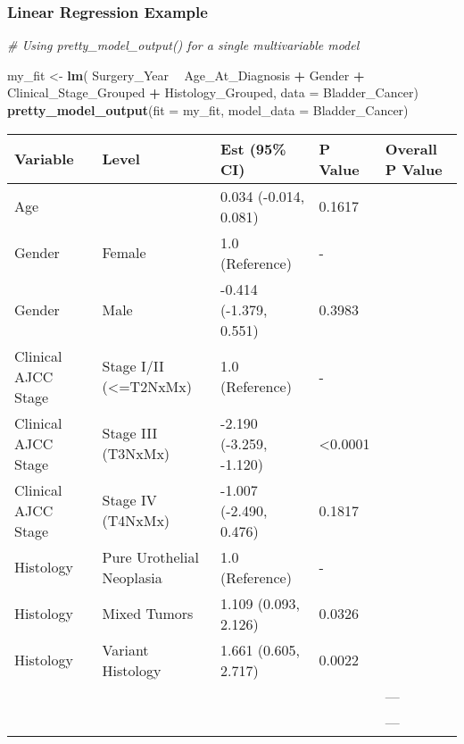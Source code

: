 \documentclass[table]{article}
\newenvironment{Shaded}{\begin{snugshade}}{\end{snugshade}}
\newcommand{\CommentTok}[1]{\textcolor[rgb]{0.56,0.35,0.01}{\textit{#1}}}
\newcommand{\DataTypeTok}[1]{\textcolor[rgb]{0.13,0.29,0.53}{#1}}
\newcommand{\KeywordTok}[1]{\textcolor[rgb]{0.13,0.29,0.53}{\textbf{#1}}}
\newcommand{\NormalTok}[1]{#1}
\newcommand{\OperatorTok}[1]{\textcolor[rgb]{0.81,0.36,0.00}{\textbf{#1}}}
\newcommand{\StringTok}[1]{\textcolor[rgb]{0.31,0.60,0.02}{#1}}
\begin{document}
\clearpage

\hypertarget{linear-regression-example}{%
\subsubsection{Linear Regression
Example}\label{linear-regression-example}}

\begin{Shaded}
\begin{Highlighting}[]
\CommentTok{# Using pretty_model_output() for a single multivariable model}

\NormalTok{my_fit <-}\StringTok{ }\KeywordTok{lm}\NormalTok{(}
\NormalTok{  Surgery_Year }\OperatorTok{~}\StringTok{ }\NormalTok{Age_At_Diagnosis }\OperatorTok{+}\StringTok{ }\NormalTok{Gender }\OperatorTok{+}\StringTok{ }\NormalTok{Clinical_Stage_Grouped }\OperatorTok{+}
\StringTok{    }\NormalTok{Histology_Grouped, }\DataTypeTok{data =}\NormalTok{ Bladder_Cancer)}
\KeywordTok{pretty_model_output}\NormalTok{(}\DataTypeTok{fit =}\NormalTok{ my_fit, }\DataTypeTok{model_data =}\NormalTok{ Bladder_Cancer)}
\end{Highlighting}
\end{Shaded}

\begin{tabular}{l|l|l|l|l}
\hline
Variable & Level & Est (95\% CI) & P Value & Overall P Value\\
\hline
Age &  & 0.034 (-0.014, 0.081) & 0.1617 & \\
\hline
Gender & Female & 1.0 (Reference) & - & \\
\hline
Gender & Male & -0.414 (-1.379, 0.551) & 0.3983 & \\
\hline
Clinical AJCC Stage & Stage I/II (<=T2NxMx) & 1.0 (Reference) & - & \\
\hline
Clinical AJCC Stage & Stage III (T3NxMx) & -2.190 (-3.259, -1.120) & <0.0001 & \\
\hline
Clinical AJCC Stage & Stage IV (T4NxMx) & -1.007 (-2.490, 0.476) & 0.1817 & \\
\hline
Histology & Pure Urothelial Neoplasia & 1.0 (Reference) & - & \\
\hline
Histology & Mixed Tumors & 1.109 (0.093, 2.126) & 0.0326 & \\
\hline
Histology & Variant Histology & 1.661 (0.605, 2.717) & 0.0022 & \\
\hline
 &  &  &  & ---\\
\hline
 &  &  &  & ---\\
\hline
\end{tabular}
\end{document}
